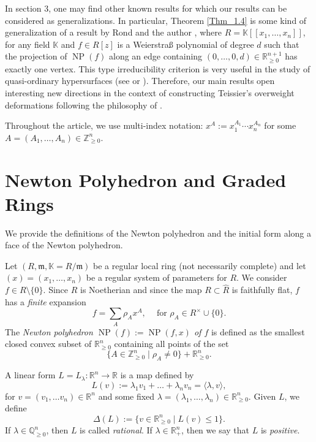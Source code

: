 \documentclass[11pt]{amsart}
\theoremstyle{plain}
\theoremstyle{definition}
\numberwithin{equation}{section}
\newcommand{\NP}{\operatorname{NP}}
\renewcommand{\l}{\lambda}
\renewcommand{\r}{\rho}
\newcommand{\D}{\Delta}
\newcommand{\KK}{{\mathbb K}}
\newcommand{\QQ}{{\mathbb Q}}
\newcommand{\RR}{\mathbb R}
\newcommand{\ZZ}{{\mathbb Z}}
\newcommand{\fm}{\mathfrak m}
\newcommand{\gqz}{{\geq 0}}
\renewcommand{\(}{(\!(}
\renewcommand{\)}{)\!)}
\begin{document}
In \cite{GH} section 3, one may find other known results for which our results can be considered as generalizations. 
In particular, Theorem \ref{Thm_1.4} is some kind of generalization of a result by Rond and the author \cite{RS},
where $ R = \KK[[x_1, \ldots, x_n]] $, for any field $ \KK $
and
$ f \in R[z] $ is a Weierstra{\ss} polynomial of degree $ d $ such that 
the projection of $ \NP(f) $ along an edge containing $ (0, \ldots, 0 ,d) \in \RR^{n+1}_\gqz  $ has exactly one vertex.
This type irreducibility criterion is very useful in the study of quasi-ordinary hypersurfaces (see \cite{ACLM} or \cite{MS}).
Therefore, our main results open interesting new directions in the context of constructing Teissier's overweight deformations \cite{T} following the philosophy of \cite{MS}.


Throughout the article, we use multi-index notation:
$ x^A :=x_1^{A_1}\cdots x_n^{A_n} $ for some $ A =  (A_1, \ldots, A_n ) \in \ZZ^n_\gqz $.  



\section{Newton Polyhedron and Graded Rings}
\label{sec:2}

We provide the definitions of the Newton polyhedron
and the initial form along a face of the Newton polyhedron. 
 
Let $ (R, \fm, \KK = R/\fm) $ be a regular local ring (not necessarily complete)
and
let $ (x) = (x_1, \ldots, x_n) $ be a regular system of parameters for $ R $.
We consider $ f \in R \setminus \{ 0 \} $.
Since $ R $ is Noetherian and since the map $ R \subset \widehat R $ is faithfully flat, 
$ f $ has a {\em finite} expansion 
\[
	f = \sum_{A} \r_A x^A,
	\  \ \ \
	\mbox{ for } \r_A \in R^\times \cup \{ 0 \}.
\] 
The {\em Newton polyhedron $ \NP(f) := \NP(f,x) $ of $ f $} is defined as the smallest closed convex subset of $ \RR_\gqz^n $ 
containing all points of the set 
\[
\{ A \in \ZZ_{\geq 0}^n \mid \r_A \neq 0 \}  + \RR^n_ \gqz .
\]

A linear form $  L = L_\l : \RR^n \to \RR $ is
a map defined by
\[
	L(v ) := \l_1 v_1 + \ldots + \l_n v_n = \langle \l, v \rangle, 
\]
for $ v = (v_1, \ldots v_n) \in \RR^n $ and some fixed $ \l = (\l_1, \ldots, \l_n ) \in \RR^n_\gqz $.
Given $ L $, we define
\[
	\D(L) := \{ v \in \RR^n_\gqz \mid L(v) \leq 1 \}.
\]
If $ \l \in \QQ^n_\gqz $, then $ L $ is called {\em rational}.
If $ \l \in \RR_+^n $, then we say that $ L $ is {\em positive}.
\end{document}
